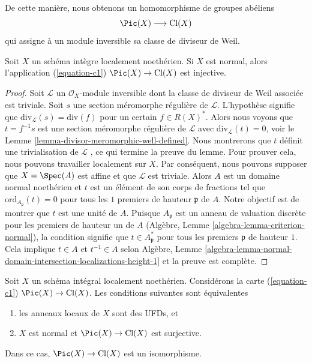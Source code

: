 \noindent
De cette manière, nous obtenons un homomorphisme de groupes abéliens
\begin{equation}
\label{equation-c1}
\Pic(X) \longrightarrow \text{Cl}(X)
\end{equation}
qui assigne à un module inversible sa classe de diviseur de Weil.

\begin{lemma}
\label{lemma-normal-c1-injective}
Soit  $X$  un schéma intègre localement noethérien. Si  $X$  est
normal, alors l'application (\ref{equation-c1})  $\Pic(X) \to \text{Cl}(X)$  est injective.
\end{lemma}

\begin{proof}
Soit  $\mathcal{L}$  un  $\mathcal{O}_X$-module inversible dont la classe de diviseur de
Weil associée est triviale. Soit  $s$  une section méromorphe régulière de
 $\mathcal{L}$. L'hypothèse signifie que  $\text{div}_\mathcal{L}(s) = \text{div}(f)$  pour un certain  $f \in R(X)^*$.
Alors nous voyons que  $t = f^{-1}s$  est une section méromorphe régulière de
 $\mathcal{L}$  avec  $\text{div}_\mathcal{L}(t) = 0$, voir le Lemme  \ref{lemma-divisor-meromorphic-well-defined}. Nous montrerons que
 $t$  définit une trivialisation de  $\mathcal{L}$ , ce qui termine la preuve
du lemme. Pour prouver cela, nous pouvons travailler localement sur  $X$.
Par conséquent, nous pouvons supposer que  $X = \Spec(A)$  est affine et que
 $\mathcal{L}$  est triviale. Alors  $A$  est un domaine normal noethérien et
 $t$  est un élément de son corps de fractions tel que  $\text{ord}_{A_\mathfrak p}(t) = 0$  pour
tous les  $1$  premiers de hauteur  $\mathfrak p$  de  $A$. Notre
objectif est de montrer que  $t$  est une unité de  $A$. Puisque
 $A_\mathfrak p$  est un anneau de valuation discrète pour les premiers de hauteur un
de  $A$  (Algèbre, Lemme  \ref{algebra-lemma-criterion-normal}), la condition signifie que
 $t \in A_\mathfrak p^*$  pour tous les premiers  $\mathfrak p$  de hauteur  $1$. Cela
implique  $t \in A$  et  $t^{-1} \in A$  selon Algèbre, Lemme  \ref{algebra-lemma-normal-domain-intersection-localizations-height-1}  et la
preuve est complète.
\end{proof}

\begin{lemma}
\label{lemma-local-rings-UFD-c1-bijective}
Soit  $X$  un schéma intégral localement noethérien. Considérons la carte
(\ref{equation-c1})  $\Pic(X) \to \text{Cl}(X)$. Les conditions suivantes sont équivalentes
\begin{enumerate}
\item les anneaux locaux de  $X$  sont des UFDs, et
\item $X$  est normal et  $\Pic(X) \to \text{Cl}(X)$  est surjective.
\end{enumerate}
Dans ce cas,  $\Pic(X) \to \text{Cl}(X)$  est un isomorphisme.
\end{lemma}


